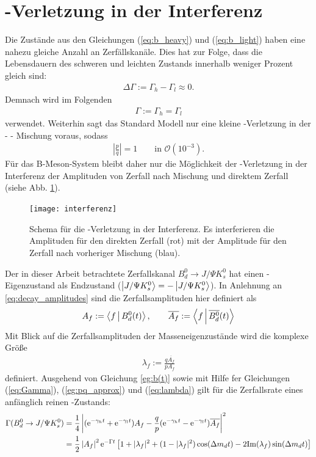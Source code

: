 \section{\CP-Verletzung in der Interferenz}
Die Zustände aus den Gleichungen (\ref{eq:b_heavy}) und (\ref{eq:b_light}) haben eine nahezu gleiche Anzahl an Zerfällskanäle. Dies hat zur Folge, dass die Lebensdauern des schweren und leichten Zustands innerhalb weniger Prozent gleich sind:
\begin{align}
\Delta \Gamma := \Gamma_h - \Gamma_l \approx 0.
\end{align}
Demnach wird im Folgenden 
\begin{align}
\Gamma := \Gamma_h = \Gamma_l \label{eq:Gamma}
\end{align}
verwendet. Weiterhin sagt das Standard Modell nur eine kleine \CP-Verletzung in der \Bd - \Bdbar - Mischung voraus, sodass
\begin{align}
\left|\frac{p}{q}\right| = 1 \qquad \text{in } \mathcal{O}(10^{-3}). \label{eg:pq_approx}
\end{align}
Für das B-Meson-System bleibt daher nur die Möglichkeit der \CP-Verletzung in der Interferenz der Amplituden von Zerfall nach Mischung und direktem Zerfall (siehe Abb. \ref{fig:interferenz}). 
\begin{figure}[hptb]
\centering
\texttt{[image: interferenz]}
\caption{Schema für die \CP-Verletzung in der Interferenz. Es interferieren die Amplituden für den direkten Zerfall (rot) mit der Amplitude für den Zerfall nach vorheriger Mischung (blau).}
\label{fig:interferenz}
\end{figure}
Der in dieser Arbeit betrachtete Zerfallskanal $B_d^0 \rightarrow J/\Psi K_s^0$ hat einen \CP-Eigenzustand als Endzustand (\CP $\Ket{J/\Psi K_s^0} = -\Ket{J/\Psi K_s^0}$). In Anlehnung an \ref{eq:decay_amplitudes} sind die Zerfallsamplituden hier definiert als
\begin{align}
\nonumber A_f := \Braket{f|\text{$B_d^0$}(t)}, \qquad \overline{A_{f}} := \Braket{f|\text{$\overline{B_d^0}$}(t)}
\end{align}
Mit Blick auf die Zerfallsamplituden der Masseneigenzustände wird die komplexe Größe
\begin{align}
\lambda_f := \frac{q\overline{A_f}}{pA_f} \label{eq:lambda}
\end{align}
definiert. Ausgehend von Gleichung \ref{eg:b(t)} sowie mit Hilfe fer Gleichungen (\ref{eq:Gamma}), (\ref{eg:pq_approx}) und (\ref{eq:lambda}) gilt für die Zerfallsrate eines anfänglich reinen \Bd-Zustands:
\begin{align}
\nonumber \Gamma (\text{$B_d^0$} \rightarrow J/\Psi K_s^0) &= \frac{1}{4}\left| (\mathrm{e}^{-\gamma_h t}+\mathrm{e}^{-\gamma_l t})A_f - \frac{q}{p}(\mathrm{e}^{-\gamma_h t}-\mathrm{e}^{-\gamma_l t})\overline{A_f}\right|^2 \\
&= \frac{1}{2} \left|A_f\right|^2\mathrm{e}^{-\Gamma t} \left[1+|\lambda_f|^2 + (1-|\lambda_f|^2)\cos(\Delta m_d t) - 2\mathrm{Im}(\lambda_f)\sin(\Delta m_d t)\right] \label{eq:bd}
\end{align}
